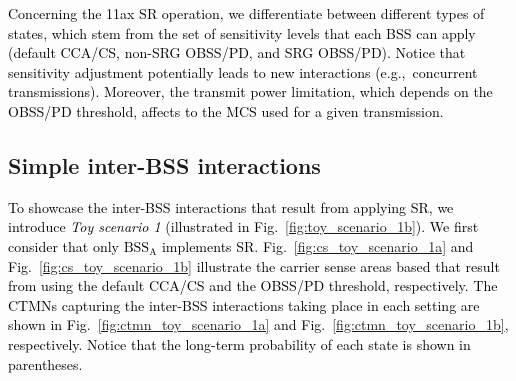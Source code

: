 \documentclass[preprint,12pt]{elsarticle}
\begin{document}
\textcolor{black}{Concerning the 11ax SR operation, we differentiate between different types of states, which stem from the set of sensitivity levels that each BSS can apply (default CCA/CS, non-SRG OBSS/PD, and SRG OBSS/PD). Notice that sensitivity adjustment potentially leads to new interactions (e.g.,~concurrent transmissions). Moreover, the transmit power limitation, which depends on the OBSS/PD threshold, affects to the MCS used for a given transmission.}

\subsection{Simple inter-BSS interactions}
\label{section:simple_interactions}
\textcolor{black}{To showcase the inter-BSS interactions that result from applying SR, we introduce \emph{Toy scenario 1} (illustrated in Fig.~\ref{fig:toy_scenario_1b}). We first consider that only $\text{BSS}_\text{A}$ implements SR. Fig.~\ref{fig:cs_toy_scenario_1a} and Fig.~\ref{fig:cs_toy_scenario_1b} illustrate the carrier sense areas based that result from using the default CCA/CS and the OBSS/PD threshold, respectively. The CTMNs capturing the inter-BSS interactions taking place in each setting are shown in Fig.~\ref{fig:ctmn_toy_scenario_1a} and Fig.~\ref{fig:ctmn_toy_scenario_1b}, respectively. Notice that the long-term probability of each state is shown in parentheses.}
\end{document}
